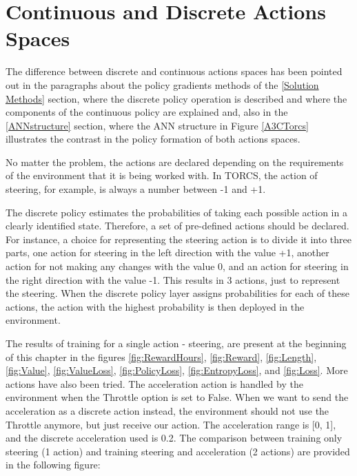 \section{Continuous and Discrete Actions Spaces}\label{ContinuousDiscreteActionsSpaces}
The difference between discrete and continuous actions spaces has been pointed out in the paragraphs about the policy gradients methods of the \ref{Solution Methods} section, where the discrete policy operation is described and where the components of the continuous policy are explained and, also in the \ref{ANNstructure} section, where the ANN structure in Figure \ref{A3CTorcs} illustrates the contrast in the policy formation of both actions spaces.

No matter the problem, the actions are declared depending on the requirements of the environment that it is being worked with. In TORCS, the action of steering, for example, is always a number between -1 and +1.

The discrete policy estimates the probabilities of taking each possible action in a clearly identified state. Therefore, a set of pre-defined actions should be declared. For instance, a choice for representing the steering action is to divide it into three parts, one action for steering in the left direction with the value +1, another action for not making any changes with the value 0, and an action for steering in the right direction with the value -1. This results in 3 actions, just to represent the steering. When the discrete policy layer assigns probabilities for each of these actions, the action with the highest probability is then deployed in the environment.

The results of training for a single action - steering, are present at the beginning of this chapter in the figures \ref{fig:RewardHours}, \ref{fig:Reward}, \ref{fig:Length}, \ref{fig:Value}, \ref{fig:ValueLoss}, \ref{fig:PolicyLoss}, \ref{fig:EntropyLoss}, and \ref{fig:Loss}. More actions have also been tried. The acceleration action is handled by the environment when the Throttle option is set to False. When we want to send the acceleration as a discrete action instead, the environment should not use the Throttle anymore, but just receive our action. The acceleration range is [0, 1], and the discrete acceleration used is 0.2. The comparison between training only steering (1 action) and training steering and acceleration (2 actions) are provided in the following figure:

